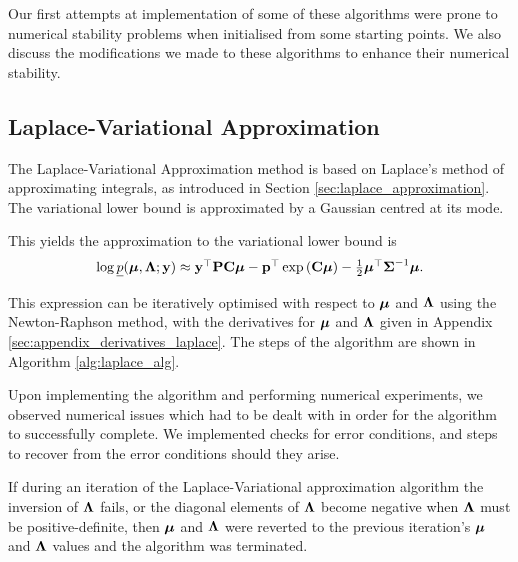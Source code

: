 Our first attempts at implementation of some of these algorithms were prone to
numerical stability problems when initialised from some starting points. We
also discuss the modifications we made to these algorithms to enhance their
numerical stability.
	
\subsection{Laplace-Variational Approximation}

The Laplace-Variational Approximation method is based on Laplace's method of
approximating integrals, as introduced in Section
\ref{sec:laplace_approximation}. The variational lower bound  is approximated
by a Gaussian centred at its mode.

This yields the approximation to the variational lower bound is
\begin{equation}
\label{eq:laplace_variational_lower_bound}
\begin{array}{ll}
	\log \underline{p}({\boldsymbol \mu}, {\boldsymbol \Lambda}; {\bf y}) \approx {\bf y}^\top{\bf P}{\bf C}{\boldsymbol\mu} - {\bf p}^\top\exp \left ({\bf C} {\boldsymbol \mu} \right ) - \tfrac{1}{2} {\boldsymbol \mu}^\top {\boldsymbol\Sigma}^{-1} {\boldsymbol \mu}. 
\end{array}
\end{equation}
		
\noindent This expression can be iteratively optimised with respect to ${\boldsymbol \mu}$
and ${\boldsymbol \Lambda}$ using the Newton-Raphson method, with the derivatives for ${\boldsymbol \mu}$
and ${\boldsymbol \Lambda}$ given in Appendix \ref{sec:appendix_derivatives_laplace}. The
steps of the algorithm are shown in Algorithm \ref{alg:laplace_alg}.
		
Upon implementing the algorithm and performing numerical experiments, we
observed numerical issues which had to be dealt with in order for the algorithm
to successfully complete.
We implemented checks for error conditions, and steps to recover from the error
conditions should they arise.

If during an iteration of the Laplace-Variational approximation algorithm the
inversion  of ${\boldsymbol \Lambda}$ fails, or the diagonal elements of ${\boldsymbol \Lambda}$ become
negative when ${\boldsymbol \Lambda}$ must be positive-definite, then ${\boldsymbol \mu}$ and ${\boldsymbol \Lambda}$
were reverted to the previous iteration's ${\boldsymbol \mu}$ and ${\boldsymbol \Lambda}$ values and the
algorithm was terminated.

